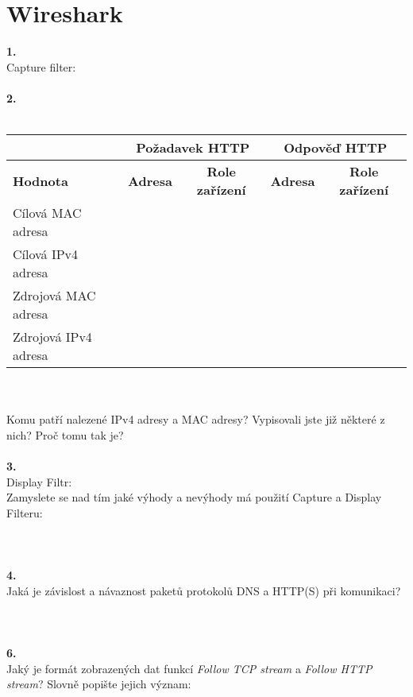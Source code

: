 \section{Wireshark}
\textbf{1.}\\
Capture filter:\\
\\
\textbf{2.}
\\
\vspace{-1em}
\\
\begin{tabular}{|l|c|c|c|c|}
\hline
& \multicolumn{2}{|c|}{\textbf{Požadavek HTTP}} & \multicolumn{2}{|c|}{\textbf{Odpověď HTTP}}\\
\hline
\textbf{Hodnota} & \textbf{Adresa} & \textbf{Role zařízení} & \textbf{Adresa} & \textbf{Role zařízení}\\
\hline
Cílová MAC adresa & \hspace{8em} & \hspace{6em} & \hspace{8em} & \hspace{6em} \\
\hline
Cílová IPv4 adresa & & & & \\
\hline
Zdrojová MAC adresa & & & & \\
\hline
Zdrojová IPv4 adresa & & & & \\
\hline
\end{tabular}
\\
\\
Komu patří nalezené IPv4 adresy a MAC adresy? Vypisovali jste již některé z nich? Proč tomu tak je?\\
\\


\textbf{3.}\\
Display Filtr:\\
Zamyslete se nad tím jaké výhody a nevýhody má použití Capture a Display
Filteru:
\\
\\
\\
\\
\textbf{4.}\\
Jaká je závislost a návaznost paketů protokolů DNS a HTTP(S) při komunikaci?\\
\\
\\
\\
\textbf{6.}\\
Jaký je formát zobrazených dat funkcí \emph{Follow TCP stream} a \emph{Follow HTTP stream}? Slovně popište jejich význam:\\
\\


